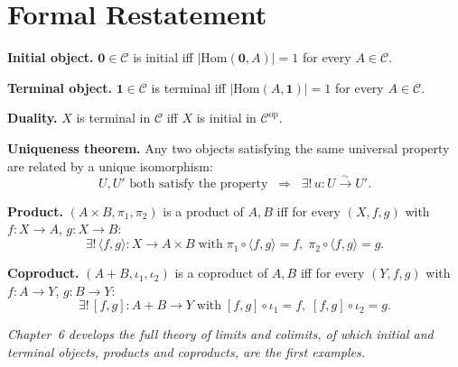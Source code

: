 \section*{Formal Restatement}

\begin{formalrestatement}
\textbf{Initial object.}\quad
$\mathbf{0} \in \mathcal{C}$ is initial iff
$|\mathrm{Hom}(\mathbf{0}, A)| = 1$ for every $A \in \mathcal{C}$.

\medskip
\textbf{Terminal object.}\quad
$\mathbf{1} \in \mathcal{C}$ is terminal iff
$|\mathrm{Hom}(A, \mathbf{1})| = 1$ for every $A \in \mathcal{C}$.

\medskip
\textbf{Duality.}\quad
$X$ is terminal in $\mathcal{C}$ iff $X$ is initial in
$\mathcal{C}^{\mathrm{op}}$.

\medskip
\textbf{Uniqueness theorem.}\quad
Any two objects satisfying the same universal property are related by a
unique isomorphism:
\begin{equation*}
  U, U' \text{ both satisfy the property}
  \;\;\Longrightarrow\;\;
  \exists !\, u : U \xrightarrow{\sim} U'.
\end{equation*}

\medskip
\textbf{Product.}\quad
$(A \times B, \pi_1, \pi_2)$ is a product of $A, B$ iff for every
$(X, f, g)$ with $f : X \to A$, $g : X \to B$:
\begin{equation*}
  \exists !\, \langle f, g \rangle : X \to A \times B
  \;\text{with}\;
  \pi_1 \circ \langle f, g \rangle = f,\;
  \pi_2 \circ \langle f, g \rangle = g.
\end{equation*}

\medskip
\textbf{Coproduct.}\quad
$(A + B, \iota_1, \iota_2)$ is a coproduct of $A, B$ iff for every
$(Y, f, g)$ with $f : A \to Y$, $g : B \to Y$:
\begin{equation*}
  \exists !\, [f, g] : A + B \to Y
  \;\text{with}\;
  [f, g] \circ \iota_1 = f,\;
  [f, g] \circ \iota_2 = g.
\end{equation*}

\medskip
\noindent\textit{Chapter~6 develops the full theory of limits and colimits,
of which initial and terminal objects, products and coproducts, are the
first examples.}
\end{formalrestatement}
